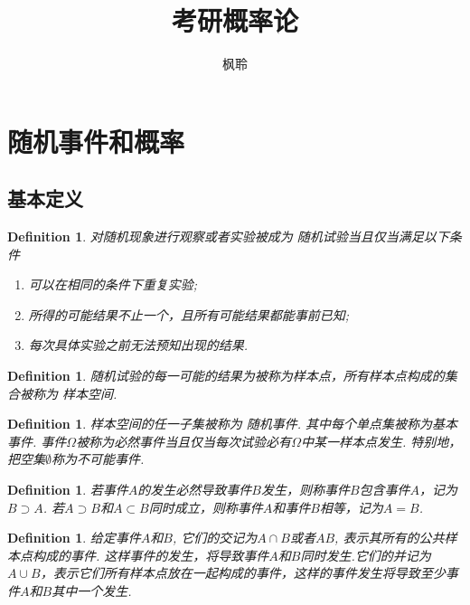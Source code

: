 \documentclass{article}
\newtheorem{definition}[theorem]{Definition}
\begin{document}
\title{考研概率论}
\author{枫聆}
\maketitle

\tableofcontents

\newpage
\section{随机事件和概率}

\subsection{基本定义}

\begin{definition}
\rm 对随机现象进行观察或者实验被成为{\color{red} 随机试验}当且仅当满足以下条件
\begin{enumerate}
	\item 可以在相同的条件下{\color{red}重复实验};
	\item 所得的可能结果不止一个，且所有可能结果都能{\color{red}事前已知};
	\item 每次具体实验之前{\color{red}无法预知}出现的结果.
\end{enumerate}
\end{definition}

\begin{definition}
\rm {\color{red}随机试验}的每一可能的结果为被称为{\color{red}样本点}，所有{\color{red}样本点}构成的集合被称为{\color{red} 样本空间}.
\end{definition}

\begin{definition}
\rm {\color{red} 样本空间}的任一子集被称为{\color{red} 随机事件}. 其中每个单点集被称为{\color{red}基本事件}. 事件$\Omega$被称为{\color{red}必然事件}当且仅当每次试验必有$\Omega$中某一样本点发生. 特别地，把空集$\emptyset$称为{\color{red}不可能事件}.
\end{definition}

\begin{definition}
\rm 若事件$A$的发生{\color{red}必然导致}事件$B$发生，则称事件$B$包含事件$A$，记为$B \supset A$. 若$A \supset B$和$A \subset B$同时成立，则称事件$A$和事件$B$相等，记为$A=B$.
\end{definition}

\begin{definition}
\rm 给定事件$A$和$B$, 它们的交记为$A \cap B$或者$AB$, 表示其所有的公共样本点构成的事件. 这样事件的发生，将导致{\color{red}事件$A$和$B$同时发生}.它们的并记为$A \cup B$，表示它们所有样本点放在一起构成的事件，这样的事件发生将导致{\color{red}至少事件$A$和$B$其中一个发生}.
\end{definition}
\end{document}
